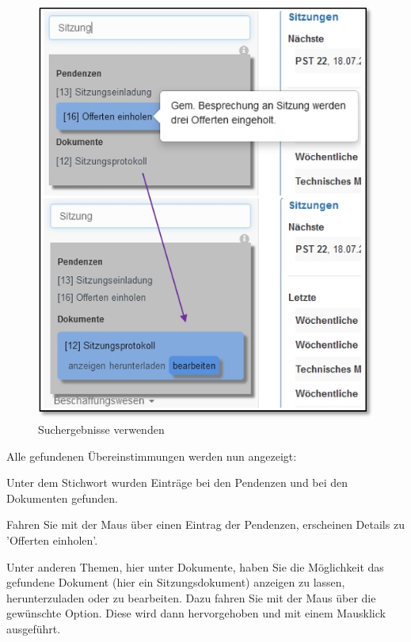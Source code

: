 \begin{figure}   %
  \vspace{-30pt}      %
  \begin{center}
    \includegraphics[width=0.8\linewidth]{../chapters/02_GettingStarted/pictures/2-5-1_Such_Ergebnisse.jpg}
  \end{center}
  \vspace{-20pt}
  \caption{Suchergebnisse verwenden}
  \vspace{-10pt}
\end{figure}

Alle gefundenen Übereinstimmungen werden nun angezeigt:

\begin{compactitem}
	\item Unter dem Stichwort wurden Einträge bei den Pendenzen und bei den Dokumenten gefunden.
	\item Fahren Sie mit der Maus über einen Eintrag der Pendenzen, erscheinen Details zu 'Offerten einholen'.
	\item Unter anderen Themen, hier unter Dokumente, haben Sie die Möglichkeit das gefundene Dokument (hier ein Sitzungsdokument) anzeigen zu lassen, herunterzuladen oder zu bearbeiten. Dazu fahren Sie mit der Maus über die gewünschte Option. Diese wird dann hervorgehoben und mit einem Mausklick ausgeführt.
\end{compactitem}

